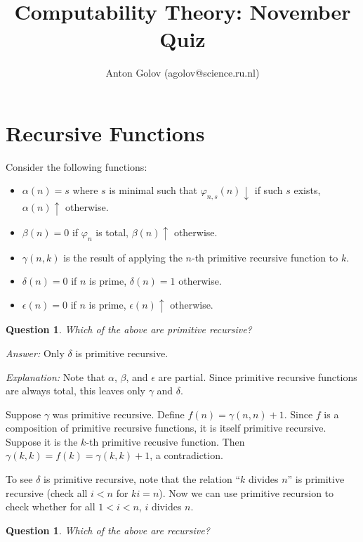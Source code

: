 \documentclass{article}
\title{Computability Theory: November Quiz}
\author{Anton Golov (agolov@science.ru.nl)}
\newtheorem{question}[theorem]{Question}
\newcommand{\terminates}{\!\!\downarrow}
\newcommand{\diverges}{\!\!\uparrow}
\begin{document}
  \maketitle

  \section{Recursive Functions}

  Consider the following functions:
  \begin{itemize}
    \item $\alpha(n) = s$ where $s$ is minimal such that $\varphi_{n,
      s}(n)\terminates$ if such $s$ exists, $\alpha(n)\diverges$ otherwise.
    \item $\beta(n) = 0$ if $\varphi_n$ is total, $\beta(n)\diverges$ otherwise.
    \item $\gamma(n, k)$ is the result of applying the $n$-th primitive
      recursive function to $k$.
    \item $\delta(n) = 0$ if $n$ is prime, $\delta(n) = 1$ otherwise.
    \item $\epsilon(n) = 0$ if $n$ is prime, $\epsilon(n)\diverges$ otherwise.
  \end{itemize}

  \begin{question}
    Which of the above are primitive recursive?
  \end{question}

  \noindent\emph{Answer:} Only $\delta$ is primitive recursive.

  \noindent\emph{Explanation:} Note that $\alpha$, $\beta$, and $\epsilon$ are partial.  Since primitive recursive functions
  are always total, this leaves only $\gamma$ and $\delta$.

  Suppose $\gamma$ was primitive recursive.  Define $f(n) = \gamma(n, n)+1$.  Since $f$ is a composition of primitive
  recursive functions, it is itself primitive recursive.  Suppose it is the $k$-th primitive recusive function.  Then
  $\gamma(k, k) = f(k) = \gamma(k, k) + 1$, a contradiction.

  To see $\delta$ is primitive recursive, note that the relation ``$k$ divides $n$'' is primitive recursive (check all
  $i < n$ for $ki = n$).  Now we can use primitive recursion to check whether for all $1 < i < n$, $i$ divides $n$.

  \begin{question}
    Which of the above are recursive?
  \end{question}
\end{document}
